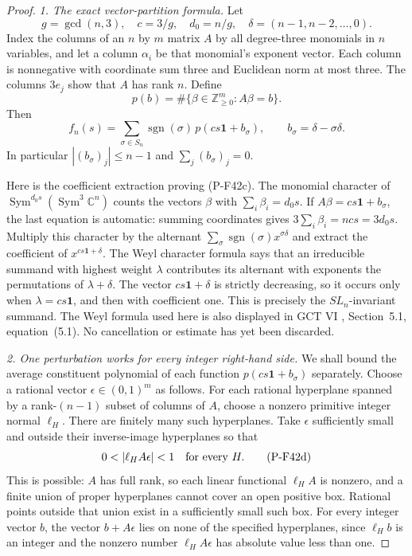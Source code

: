 \documentclass[11pt,a4paper]{article}
\begin{document}
\begin{proof}
\emph{1. The exact vector-partition formula.}
Let
\[
 g=\gcd(n,3),\quad c=3/g,\quad d_0=n/g,\quad
 \delta=(n-1,n-2,\ldots,0).
\]
Index the columns of an $n$ by $m$ matrix $A$ by all degree-three
monomials in $n$ variables, and let a column $\alpha_i$ be that
monomial's exponent vector. Each column is nonnegative with
coordinate sum three and Euclidean norm at most three.
The columns $3e_j$ show that $A$ has rank $n$. Define
\[
 p(b)=\#\{\beta\in\mathbb Z_{\ge0}^{m}:A\beta=b\}.
\]
Then
\[
 f_n(s)=
 \sum_{\sigma\in S_n}\operatorname{sgn}(\sigma)\,
       p(cs\mathbf1+b_\sigma),\qquad
 b_\sigma=\delta-\sigma\delta.
 \tag{P-F42c}
\]
In particular $|(b_\sigma)_j|\le n-1$ and
$\sum_j(b_\sigma)_j=0$.

Here is the coefficient extraction proving (P-F42c).
The monomial character of
$\operatorname{Sym}^{d_0s}(\operatorname{Sym}^3\mathbb C^n)$
counts the vectors $\beta$ with $\sum_i\beta_i=d_0s$.
If $A\beta=cs\mathbf1+b_\sigma$, the last equation is automatic:
summing coordinates gives $3\sum_i\beta_i=ncs=3d_0s$.
Multiply this character by the alternant
$\sum_{\sigma}\operatorname{sgn}(\sigma)x^{\sigma\delta}$
and extract the coefficient of $x^{cs\mathbf1+\delta}$.
The Weyl character formula says that an irreducible summand with
highest weight $\lambda$ contributes its alternant with exponents
the permutations of $\lambda+\delta$.
The vector $cs\mathbf1+\delta$ is strictly decreasing, so it occurs
only when $\lambda=cs\mathbf1$, and then with coefficient one.
This is precisely the $SL_n$-invariant summand.
The Weyl formula used here is also displayed in GCT VI \cite{PGCTVI},
Section~5.1, equation~(5.1). No cancellation or estimate has yet
been discarded.

\emph{2. One perturbation works for every integer right-hand side.}
We shall bound the average constituent polynomial of each function
$p(cs\mathbf1+b_\sigma)$ separately. Choose a rational vector
$\epsilon\in(0,1)^m$ as follows.
For each rational hyperplane spanned by a rank-$(n-1)$ subset
of columns of $A$, choose a nonzero primitive integer normal
$\ell_H$. There are finitely many such hyperplanes. Take
$\epsilon$ sufficiently small and outside their inverse-image
hyperplanes so that
\[
             0<|\ell_H A\epsilon|<1
                    \quad\hbox{for every }H.
 \tag{P-F42d}
\]
This is possible: $A$ has full rank, so each linear functional
$\ell_H A$ is nonzero, and a finite union of proper hyperplanes
cannot cover an open positive box. Rational points outside that
union exist in a sufficiently small such box.
For every integer vector $b$, the vector $b+A\epsilon$ lies on
none of the specified hyperplanes, since $\ell_H b$ is an integer
and the nonzero number $\ell_H A\epsilon$ has absolute value less
than one.


\end{proof}
\end{document}
